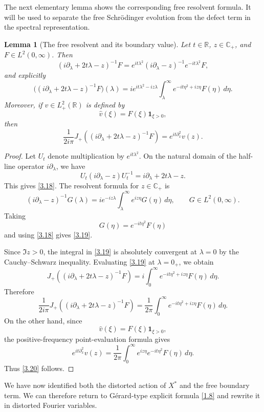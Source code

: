 \documentclass[10pt]{article}
\newtheorem{lemma}[theorem]{Lemma}
\numberwithin{equation}{section}
\numberwithin{theorem}{section}
\begin{document}
The next elementary lemma shows the corresponding free resolvent formula.
It will be used to separate the free Schrödinger evolution from the defect term in the
spectral representation.
\begin{lemma}[The free resolvent and its boundary value]
\label{lemma:free_resolvent_boundary}
Let \(t\in\mathbb R\), \(z\in\mathbb C_+\), and \(F\in L^2(0,\infty)\). Then
\begin{equation}
\label{3.18}
(i\partial_\lambda+2t\lambda-z)^{-1}F
=
e^{it\lambda^2}(i\partial_\lambda-z)^{-1}e^{-it\lambda^2}F,
\end{equation}
and explicitly
\begin{equation}
\label{3.19}
\bigl((i\partial_\lambda+2t\lambda-z)^{-1}F\bigr)(\lambda)
=
i e^{it\lambda^2-iz\lambda}
\int_\lambda^\infty
e^{-it\eta^2+iz\eta}F(\eta)\,d\eta .
\end{equation}
Moreover, if \(v\in L^2_+(\mathbb R)\) is defined by
\[
\widehat v(\xi)=F(\xi)\mathbf 1_{\xi>0},
\]
then
\begin{equation}
\label{3.20}
\frac1{2i\pi}
J_+\left((i\partial_\lambda+2t\lambda-z)^{-1}F\right)
=
e^{it\partial_x^2}v(z).
\end{equation}
\end{lemma}

\begin{proof}
Let \(U_t\) denote multiplication by \(e^{it\lambda^2}\). On the natural domain of the
half-line operator \(i\partial_\lambda\), we have
\[
U_t(i\partial_\lambda-z)U_t^{-1}
=
i\partial_\lambda+2t\lambda-z.
\]
This gives \eqref{3.18}. The resolvent formula for \(z\in\mathbb C_+\) is
\[
(i\partial_\lambda-z)^{-1}G(\lambda)
=
i e^{-iz\lambda}
\int_\lambda^\infty e^{iz\eta}G(\eta)\,d\eta ,
\qquad G\in L^2(0,\infty).
\]
Taking
\[
G(\eta)=e^{-it\eta^2}F(\eta)
\]
and using \eqref{3.18} gives \eqref{3.19}.

Since \(\Im z>0\), the integral in \eqref{3.19} is absolutely convergent at
\(\lambda=0\) by the Cauchy--Schwarz inequality. Evaluating \eqref{3.19} at
\(\lambda=0_{+}\), we obtain
\[
J_+\left((i\partial_\lambda+2t\lambda-z)^{-1}F\right)
=
i\int_0^\infty e^{-it\eta^2+iz\eta}F(\eta)\,d\eta .
\]
Therefore
\[
\frac1{2i\pi}
J_+\left((i\partial_\lambda+2t\lambda-z)^{-1}F\right)
=
\frac1{2\pi}
\int_0^\infty e^{-it\eta^2+iz\eta}F(\eta)\,d\eta .
\]
On the other hand, since
\[
\widehat v(\xi)=F(\xi)\mathbf 1_{\xi>0},
\]
the positive-frequency point-evaluation formula gives
\[
e^{it\partial_x^2}v(z)
=
\frac1{2\pi}
\int_0^\infty e^{iz\eta}e^{-it\eta^2}F(\eta)\,d\eta .
\]
Thus \eqref{3.20} follows.
\end{proof}
We have now identified both the distorted action of \(X^*\) and the free boundary term.
We can therefore return to Gérard-type explicit formula \eqref{1.8} and rewrite it in distorted Fourier variables.
\end{document}
